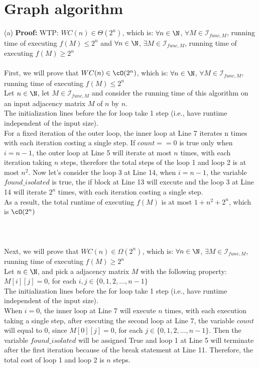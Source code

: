 \documentclass[12pt]{article}
\begin{document}
\section{Graph algorithm}

(a) \textbf{Proof:} WTP: $WC(n) \in \Theta(2^n)$, which is: $\forall n \in \N$, $\forall M \in \mathcal{I}_{func,M}$, running time of executing $f(M) \le 2^n$ and $\forall n \in \N$, $\exists M \in \mathcal{I}_{func,M}$, running time of executing $f(M) \ge 2^n$\\
\\
First, we will prove that $WC(n) \in \cO(2^n)$, which is: $\forall n \in \N$, $\forall M \in \mathcal{I}_{func,M}$, running time of executing $f(M) \le 2^n$\\
Let $n \in \N$, let $M \in \mathcal{I}_{func,M}$ and consider the running time of this algorithm on an input adjacency matrix $M$ of $n$ by $n$.\\
The initialization lines before the for loop take 1 step (i.e., have runtime independent of the input size).\\
For a fixed iteration of the outer loop, the inner loop at Line 7 iterates n times with each iteration costing a single step. If $count == 0$ is true only when $i = n-1$, the outer loop at Line 5 will iterate at most $n$ times, with each iteration taking $n$ steps, therefore the total steps of the loop 1 and loop 2 is at most $n^2$. Now let's consider the loop 3 at Line 14, when $i = n-1$, the variable $found\_isolated$ is true, the if block at Line 13 will execute and the loop 3 at Line 14 will iterate $2^n$ times, with each iteration costing a single step.\\
As a result, the total runtime of executing $f(M)$ is at most $1+n^2+2^n$, which is $\cO(2^n)$\\
\\
\\
\\
Next, we will prove that $WC(n) \in \Omega(2^n)$, which is: $\forall n \in \N$, $\exists M \in \mathcal{I}_{func,M}$, running time of executing $f(M) \ge 2^n$\\
Let $n \in \N$, and pick a adjacency matrix $M$ with the following property: $M[i][j] = 0$, for each $i,j\in \{0,1,2,...,n-1\}$\\
The initialization lines before the for loop take 1 step (i.e., have runtime independent of the input size).\\
When $i = 0$, the inner loop at Line 7 will execute $n$ times, with each execution taking a single step, after executing the second loop at Line 7, the variable $count$ will equal to 0, since $M[0][j] = 0$, for each $j \in \{0, 1, 2,..., n-1\}$. Then the variable $found\_isolated$ will be assigned True and loop 1 at Line 5 will terminate after the first iteration because of the break statement at Line 11. Therefore, the total cost of loop 1 and loop 2 is $n$ steps.\\
\end{document}
